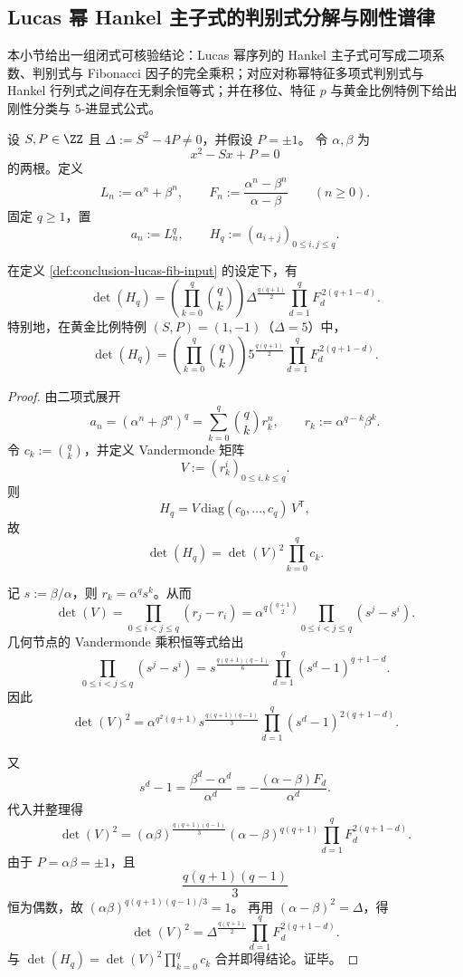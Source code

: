 \subsection{Lucas 幂 Hankel 主子式的判别式分解与刚性谱律}\label{subsec:conclusion-lucas-hankel-discriminant-rigidity}
本小节给出一组闭式可核验结论：Lucas 幂序列的 Hankel 主子式可写成二项系数、判别式与 Fibonacci 因子的完全乘积；对应对称幂特征多项式判别式与 Hankel 行列式之间存在无剩余恒等式；并在移位、特征 \(p\) 与黄金比例特例下给出刚性分类与 \(5\)-进显式公式。

\begin{definition}\label{def:conclusion-lucas-fib-input}
设 \(S,P\in\ZZ\) 且 \(\Delta:=S^2-4P\neq 0\)，并假设 \(P=\pm 1\)。
令 \(\alpha,\beta\) 为
\[
x^2-Sx+P=0
\]
的两根。定义
\[
L_n:=\alpha^n+\beta^n,\qquad
F_n:=\frac{\alpha^n-\beta^n}{\alpha-\beta}\qquad (n\ge 0).
\]
固定 \(q\ge 1\)，置
\[
a_n:=L_n^q,\qquad
H_q:=(a_{i+j})_{0\le i,j\le q}.
\]
\end{definition}

\begin{theorem}\label{thm:conclusion-lucas-power-hankel-closed-form}
在定义 \ref{def:conclusion-lucas-fib-input} 的设定下，有
\[
\det(H_q)
=
\left(\prod_{k=0}^{q}\binom{q}{k}\right)
\Delta^{\frac{q(q+1)}{2}}
\prod_{d=1}^{q}F_d^{\,2(q+1-d)}.
\]
特别地，在黄金比例特例 \((S,P)=(1,-1)\)（\(\Delta=5\)）中，
\[
\det(H_q)
=
\left(\prod_{k=0}^{q}\binom{q}{k}\right)
5^{\frac{q(q+1)}{2}}
\prod_{d=1}^{q}F_d^{\,2(q+1-d)}.
\]
\end{theorem}
\begin{proof}
由二项式展开
\[
a_n=(\alpha^n+\beta^n)^q
=\sum_{k=0}^{q}\binom{q}{k}r_k^n,\qquad
r_k:=\alpha^{q-k}\beta^k.
\]
令 \(c_k:=\binom{q}{k}\)，并定义 Vandermonde 矩阵
\[
V:=(r_k^i)_{0\le i,k\le q}.
\]
则
\[
H_q=V\,\mathrm{diag}(c_0,\dots,c_q)\,V^{\mathsf T},
\]
故
\[
\det(H_q)=\det(V)^2\prod_{k=0}^{q}c_k.
\]

记 \(s:=\beta/\alpha\)，则 \(r_k=\alpha^q s^k\)。从而
\[
\det(V)=\prod_{0\le i<j\le q}(r_j-r_i)
=\alpha^{q\binom{q+1}{2}}
\prod_{0\le i<j\le q}(s^j-s^i).
\]
几何节点的 Vandermonde 乘积恒等式给出
\[
\prod_{0\le i<j\le q}(s^j-s^i)
=
s^{\frac{q(q+1)(q-1)}{6}}
\prod_{d=1}^{q}(s^d-1)^{q+1-d}.
\]
因此
\[
\det(V)^2
=
\alpha^{q^2(q+1)}
s^{\frac{q(q+1)(q-1)}{3}}
\prod_{d=1}^{q}(s^d-1)^{2(q+1-d)}.
\]

又
\[
s^d-1
=\frac{\beta^d-\alpha^d}{\alpha^d}
=-\frac{(\alpha-\beta)F_d}{\alpha^d}.
\]
代入并整理得
\[
\det(V)^2
=
(\alpha\beta)^{\frac{q(q+1)(q-1)}{3}}
(\alpha-\beta)^{q(q+1)}
\prod_{d=1}^{q}F_d^{2(q+1-d)}.
\]
由于 \(P=\alpha\beta=\pm1\)，且
\[
\frac{q(q+1)(q-1)}{3}
\]
恒为偶数，故
\(
(\alpha\beta)^{q(q+1)(q-1)/3}=1
\)。
再用 \((\alpha-\beta)^2=\Delta\)，得
\[
\det(V)^2
=
\Delta^{\frac{q(q+1)}{2}}
\prod_{d=1}^{q}F_d^{2(q+1-d)}.
\]
与 \(\det(H_q)=\det(V)^2\prod_{k=0}^{q}c_k\) 合并即得结论。证毕。
\end{proof}

